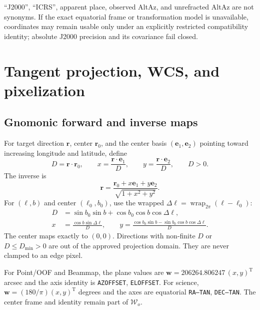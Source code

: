 \documentclass[11pt]{article}
\renewcommand{\mathsf}[1]{\mathrm{#1}}
\newcommand{\T}{\mathsf{T}}
\begin{document}
``J2000'', ``ICRS'', apparent place, observed AltAz, and unrefracted AltAz are
not synonyms.  If the exact equatorial frame or transformation model is
unavailable, coordinates may remain usable only under an explicitly
restricted compatibility identity; absolute J2000 precision and its
covariance fail closed.

\section{Tangent projection, WCS, and pixelization}

\subsection{Gnomonic forward and inverse maps}

For target direction $\boldsymbol r$, center $\boldsymbol r_0$, and the
center basis $(\boldsymbol e_1,\boldsymbol e_2)$ pointing toward increasing
longitude and latitude, define
\begin{equation}
 D=\boldsymbol r\cdot\boldsymbol r_0,\qquad
 x=\frac{\boldsymbol r\cdot\boldsymbol e_1}{D},\qquad
 y=\frac{\boldsymbol r\cdot\boldsymbol e_2}{D},\qquad D>0.
 \label{eq:tan-forward}
\end{equation}
The inverse is
\begin{equation}
 \boldsymbol r=
 \frac{\boldsymbol r_0+x\boldsymbol e_1+y\boldsymbol e_2}
      {\sqrt{1+x^2+y^2}}.
 \label{eq:tan-inverse}
\end{equation}
For $(\ell,b)$ and center $(\ell_0,b_0)$, use the wrapped
$\Delta\ell=\operatorname{wrap}_{2\pi}(\ell-\ell_0)$:
\begin{align}
 D &= \sin b_0\sin b+\cos b_0\cos b\cos\Delta\ell,\nonumber\\
 x &= \frac{\cos b\sin\Delta\ell}{D},\qquad
 y = \frac{\cos b_0\sin b-\sin b_0\cos b\cos\Delta\ell}{D}.
 \label{eq:tan-lonlat}
\end{align}
The center maps exactly to $(0,0)$.  Directions with non-finite $D$ or
$D\le D_{\min}>0$ are out of the approved projection domain.  They are never
clamped to an edge pixel.

For Point/OOF and Beammap, the plane values are
$\boldsymbol w=206264.806247\,(x,y)^\T$ arcsec and the axis identity is
\texttt{AZOFFSET}, \texttt{ELOFFSET}.  For science,
$\boldsymbol w=(180/\pi)(x,y)^\T$ degrees and the axes are equatorial
\texttt{RA---TAN}, \texttt{DEC--TAN}.  The center frame and identity remain
part of $\mathcal W_o$.
\end{document}
